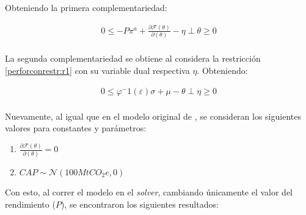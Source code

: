 Obteniendo la primera complementariedad:

\begin{equation}
\begin{array}{rrclcl}
    0\leq -P\pi^a+\frac{\partial\mathcal{F}(\theta)}{\partial(\theta)}-\eta \perp \theta \geq 0 \label{compllag2}\\
\end{array}
\end{equation}

La segunda complementariedad se obtiene al considera la restricción \ref{perforconrestr:r1} con su variable dual respectiva $\eta$. Obteniendo:

\begin{equation}
\begin{array}{rrclcl}
    0 \leq \varphi^-1 (\varepsilon )\sigma + \mu - \theta \perp \eta \geq 0 \label{compllag21}\\
\end{array}
\end{equation}

Nuevamente, al igual que en el modelo original de , se consideran los siguientes valores para constantes y parámetros:
\begin{enumerate}
    \item $\frac{\partial\mathcal{F}(\theta)}{\partial(\theta)}=0$
    \item $CAP\sim \mathcal{N}(100MtCO_{2}e,0)$
\end{enumerate}

Con esto, al correr el modelo en el \textit{solver}, cambiando únicamente el valor del rendimiento ($P$), se encontraron los siguientes resultados:

